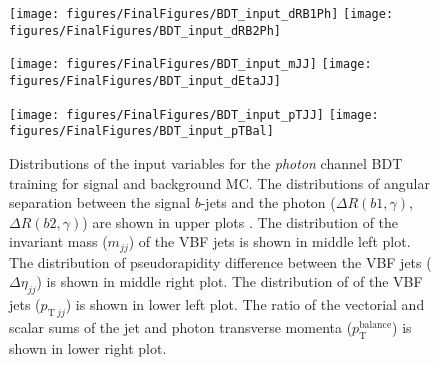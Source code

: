 \documentclass[PAPER, american,coverpage,texlive=2016, english]{\ATLASLATEXPATH atlasdoc}
\providecommand{\DIFaddbeginFL}{} %
\providecommand{\DIFaddendFL}{} %
\providecommand{\DIFdelbeginFL}{} %
\providecommand{\DIFdelendFL}{} %
\begin{document}
\begin{figure}[htbp]
  \centering

  \DIFdelbeginFL %
\DIFdelendFL \DIFaddbeginFL \texttt{[image: figures/FinalFigures/BDT\_input\_dRB1Ph]}
  \texttt{[image: figures/FinalFigures/BDT\_input\_dRB2Ph]}

\DIFaddendFL 

  \DIFdelbeginFL %
\DIFdelendFL \DIFaddbeginFL \texttt{[image: figures/FinalFigures/BDT\_input\_mJJ]}
  \texttt{[image: figures/FinalFigures/BDT\_input\_dEtaJJ]}

\DIFaddendFL 

  \DIFdelbeginFL %
\DIFdelendFL \DIFaddbeginFL \texttt{[image: figures/FinalFigures/BDT\_input\_pTJJ]}
  \texttt{[image: figures/FinalFigures/BDT\_input\_pTBal]}

\DIFaddendFL 

  \caption{Distributions of the input variables for the \textit{photon} channel BDT training for signal and background MC.
    The distributions of angular separation between the signal $b$-jets and the photon ($\Delta R(b1,\gamma)$, $\Delta R(b2,\gamma)$) are shown in upper plots . The distribution of the invariant mass ($m_{jj}$) of the VBF jets is shown in middle left plot.
    The distribution of pseudorapidity difference between the VBF jets ($\Delta \eta_{jj}$) is shown in middle right plot.
    The distribution of \pT{} of the VBF jets ($p_{\text{T}~jj}$) is shown in lower left plot.
    The ratio of the vectorial and scalar sums of the jet and photon transverse momenta ($p^\text{balance}_\text{T}$) is shown in lower right plot. }
  \label{fig:bdtvar1}
\end{figure}
\end{document}
